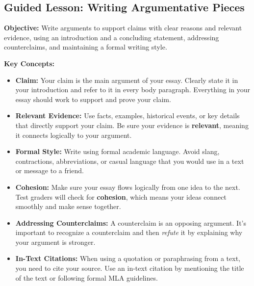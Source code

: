\documentclass[12pt]{article}
\begin{document}
\subsection*{Guided Lesson: Writing Argumentative Pieces}
\onehalfspacing

\begin{tcolorbox}[colframe=black!40, colback=gray!5, 
coltitle=black, colbacktitle=black!20, fonttitle=\bfseries\Large, 
title=Learning Objective, halign title=center, left=5pt, right=5pt, top=5pt, bottom=15pt]
\textbf{Objective:} Write arguments to support claims with clear reasons and relevant evidence, using an introduction and a concluding statement, addressing counterclaims, and maintaining a formal writing style.  
\end{tcolorbox}

\vspace{1em}

\begin{tcolorbox}[colframe=black!60, colback=white, 
coltitle=black, colbacktitle=black!15, fonttitle=\bfseries\Large, 
title=Key Concepts and Vocabulary, halign title=center, left=10pt, right=10pt, top=10pt, bottom=15pt]
\textbf{Key Concepts:}
\begin{itemize}
    \item \textbf{Claim:} Your claim is the main argument of your essay. Clearly state it in your introduction and refer to it in every body paragraph. Everything in your essay should work to support and prove your claim.
    \item \textbf{Relevant Evidence:} Use facts, examples, historical events, or key details that directly support your claim. Be sure your evidence is \textbf{relevant}, meaning it connects logically to your argument.
    \item \textbf{Formal Style:} Write using formal academic language. Avoid slang, contractions, abbreviations, or casual language that you would use in a text or message to a friend.
    \item \textbf{Cohesion:} Make sure your essay flows logically from one idea to the next. Test graders will check for \textbf{cohesion}, which means your ideas connect smoothly and make sense together.
    \item \textbf{Addressing Counterclaims:} A counterclaim is an opposing argument. It’s important to recognize a counterclaim and then \textit{refute} it by explaining why your argument is stronger.
    \item \textbf{In-Text Citations:} When using a quotation or paraphrasing from a text, you need to cite your source. Use an in-text citation by mentioning the title of the text or following formal MLA guidelines.
\end{itemize}

\end{tcolorbox}
\end{document}
